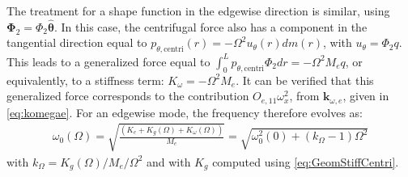 \documentclass[wes, manuscript]{copernicus}
\renewcommand{\v}[1]{\boldsymbol{#1}}
\begin{document}
The treatment for a shape function in the edgewise direction is similar, using $\v{\Phi}_2=\Phi_2 \v{\hat{\theta}}$. In this case, the centrifugal force also has a component in the tangential direction equal to $p_{\theta,\text{centri}}(r) = -\Omega^2u_\theta(r) dm(r)$, with $u_\theta=\Phi_2 q$. 
This leads to a generalized force equal to $\int_0^L p_{\theta,\text{centri}} \Phi_2 dr=-\Omega^2 M_{e} q$, or equivalently, to a stiffness term: $K_{\omega}=-\Omega^2 M_{e}$. It can be verified that this generalized force corresponds to the contribution $O_{e,11}\omega_x^2$, from $\v{k}_{\omega,e}$, given in \autoref{eq:komegae}. For an edgewise mode, the frequency therefore evolves as: 
\begin{align}
 \omega_0(\Omega)=\sqrt{\frac{(K_{e}+ K_g(\Omega)+K_\omega(\Omega))}{M_e}}=\sqrt{\omega_0^2(0)+(k_\Omega-1)\Omega^2}
\end{align}
 with $k_\Omega=K_g(\Omega)/M_e/\Omega^2$ and with $K_g$ computed using \autoref{eq:GeomStiffCentri}.
\end{document}
